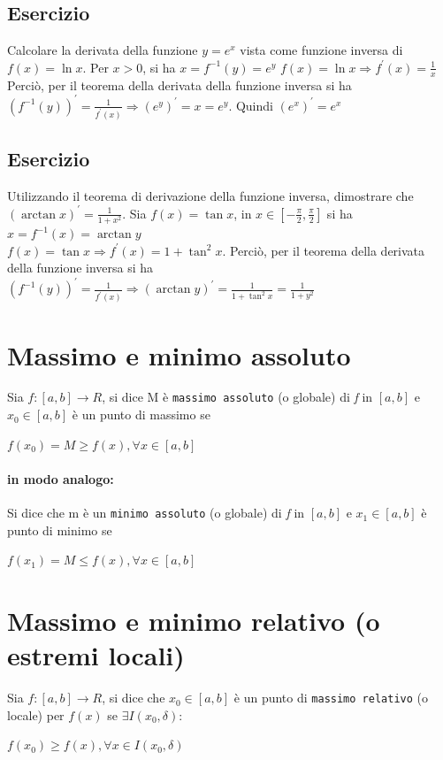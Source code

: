 \subsection{Esercizio}
Calcolare la derivata della funzione $y=e^x$ vista come funzione inversa di
$f(x)=\ln x$. Per $x>0$, si ha $x=f^{-1}(y)=e^y$
$f(x)=\ln x\Rightarrow f^\prime(x)=\frac{1}{x}$ Perciò, per il teorema della
derivata della funzione inversa si ha
$(f^{-1}(y))^\prime=\frac{1}{f^\prime(x)}\Rightarrow (e^y)^\prime=x=e^y$.
Quindi $(e^x)^\prime=e^x$
\subsection{Esercizio}
Utilizzando il teorema di derivazione della funzione inversa, dimostrare che
$(\arctan x)^\prime=\frac{1}{1+x^2}$. Sia $f(x)=\tan x$, in
$x\in[-\frac{\pi}{2},\frac{\pi}{2}]$ si ha $x=f^{-1}(x)=\arctan y$\\
$f(x)=\tan x\Rightarrow f^\prime(x)=1+\tan^2x$. Perciò, per il teorema della
derivata della funzione inversa si ha
$(f^{-1}(y))^\prime=\frac{1}{f^\prime(x)}\Rightarrow (\arctan
y)^\prime=\frac{1}{1+\tan^2 x}=\frac{1}{1+y^2}$
\section{Massimo e minimo assoluto}
Sia $f:[a,b]\to R$, si dice M è \texttt{massimo assoluto} (o globale) di
\textit{f} in $[a, b]$ e $x_0\in[a, b]$ è un punto di massimo se
\begin{center}
	$f(x_0)=M\geq f(x),\forall x \in [a, b]$
\end{center}
\paragraph{in modo analogo:}
Si dice che m è un \texttt{minimo assoluto} (o globale) di
\textit{f} in $[a, b]$ e $x_1\in[a, b]$ è punto di minimo se 
\begin{center}
	$f(x_1)=M\leq f(x),\forall x \in [a, b]$
\end{center}
\section{Massimo e minimo relativo (o estremi locali)}
Sia $f:[a,b]\to R$, si dice che $x_0\in[a, b]$ è un punto di \texttt{massimo
relativo} (o locale) per $f(x)$ se $\exists I (x_0,\delta)$:
\begin{center}
	$f(x_0)\geq f(x),\forall x \in I (x_0,\delta)$
\end{center}
